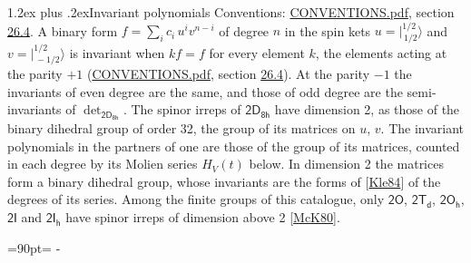 \documentclass[10pt,a4paper]{article}
\makeatletter
\renewcommand\section{\@startsection{section}{1}{\z@}{-3ex plus -1ex minus -.2ex}%
  {1.2ex plus .2ex}{\normalfont\large\sffamily\bfseries\color{parttitle}}}
\newcommand{\needspace}[1]{\par\penalty-100\begingroup\dimen0=#1\relax\dimen2=\pagegoal
  \advance\dimen2-\pagetotal\ifdim\dimen0>\dimen2\relax\ifdim\dimen2>0pt\vfil\break\fi\fi
  \endgroup}
\numberwithin{equation}{section}
\newcommand{\grp}[1]{\mathsf{#1}}
\newcommand{\jm}[2]{\bigl\lvert{}^{#1}_{\,#2}\bigr\rangle}
\makeatother
\begin{document}
\section{Invariant polynomials}\label{s:invariants}
Conventions: \href{../../CONVENTIONS.pdf}{CONVENTIONS.pdf}, section \href{../../CONVENTIONS.pdf\#conv.26.4}{26.4}.
\leavevmode\label{n:local.binary.form}A binary form $f = \sum_i c_i\, u^i v^{n-i}$ of degree $n$ in the spin kets $u = \jm{1/2}{1/2}$ and $v = \jm{1/2}{-1/2}$ is invariant when $k f = f$ for every element $k$, the elements acting at the parity $+1$ (\href{../../CONVENTIONS.pdf}{CONVENTIONS.pdf}, section \href{../../CONVENTIONS.pdf\#conv.26.4}{26.4}). At the parity $-1$ the invariants of even degree are the same, and those of odd degree are the semi-invariants of $\det_{\grp{2D_{8h}}}$.
The spinor irreps of $\grp{2D_{8h}}$ have dimension 2, as those of the binary dihedral group of order 32, the group of its matrices on $u$, $v$. \label{n:function.hilbert}The invariant polynomials in the partners of one are those of the group of its matrices, counted in each degree by its Molien series $H_V(t)$ below. In dimension 2 the matrices form a binary dihedral group, whose invariants are the forms of [\href{../../../REFERENCES.pdf\#ref.Kle84}{Kle84}] of the degrees of its series. Among the finite groups of this catalogue, only $\grp{2O}$, $\grp{2T_{d}}$, $\grp{2O_{h}}$, $\grp{2I}$ and $\grp{2I_{h}}$ have spinor irreps of dimension above 2 [\href{../../../REFERENCES.pdf\#ref.McK80}{McK80}].
\needspace{90pt}
\end{document}
